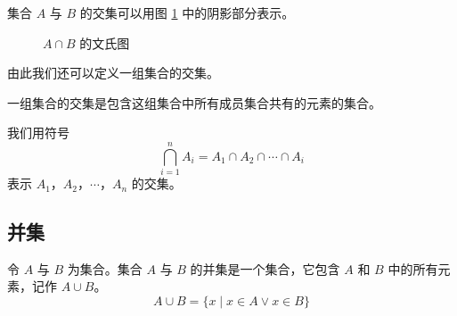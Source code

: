 \documentclass[lang=cn, chinesefont=founder, math=cm, color=cyan, citestyle=gb7714-2015, bibstyle=gb7714-2015]{elegantbook}
\begin{document}
集合 $A$ 与 $B$ 的交集可以用图 \ref{fig:交集文氏图} 中的阴影部分表示。
\begin{figure}[htbp!]
    \centering
    \caption{$A \cap B$ 的文氏图}
    \label{fig:交集文氏图}
\end{figure}

由此我们还可以定义一组集合的交集。
\begin{definition}[多个集合的交集]\label{def:多个交集}
    一组集合的交集是包含这组集合中所有成员集合共有的元素的集合。
\end{definition}

我们用符号
\begin{equation*}
    \bigcap_{i=1}^n A_i=A_1 \cap A_2 \cap \cdots \cap A_i
\end{equation*}
表示 $A_1$，$A_2$，$\cdots$，$A_n$ 的交集。

\subsection{并集}
\begin{definition}[集合的并集]\label{def:并集}
    令 $A$ 与 $B$ 为集合。集合 $A$ 与 $B$ 的并集是一个集合，它包含 $A$ 和 $B$ 中的所有元素，记作 $A \cup B$。
    \begin{equation*}
        A \cup B = \{x \mid x \in A \lor x \in B\}
    \end{equation*}
\end{definition}
\end{document}
